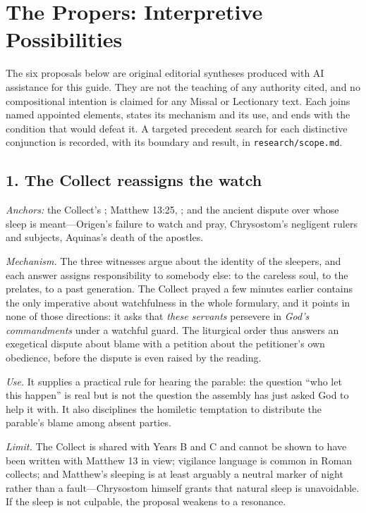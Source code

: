 \section*{The Propers: Interpretive Possibilities}

The six proposals below are original editorial syntheses produced with AI
assistance for this guide. They are not the teaching of any authority cited,
and no compositional intention is claimed for any Missal or Lectionary text.
Each joins named appointed elements, states its mechanism and its use, and ends
with the condition that would defeat it. A targeted precedent search for each
distinctive conjunction is recorded, with its boundary and result, in
\texttt{research/scope.md}.

\subsection*{1. The Collect reassigns the watch}

\emph{Anchors:} the Collect's ; Matthew
13:25, ; and the ancient dispute over whose
sleep is meant---Origen's failure to watch and pray, Chrysostom's negligent
rulers and subjects, Aquinas's death of the apostles.

\emph{Mechanism.} The three witnesses argue about the identity of the sleepers,
and each answer assigns responsibility to somebody else: to the careless soul,
to the prelates, to a past generation. The Collect prayed a few minutes earlier
contains the only imperative about watchfulness in the whole formulary, and it
points in none of those directions: it asks that \emph{these servants} persevere
in \emph{God's commandments} under a watchful guard. The liturgical order thus
answers an exegetical dispute about blame with a petition about the
petitioner's own obedience, before the dispute is even raised by the reading.

\emph{Use.} It supplies a practical rule for hearing the parable: the question
``who let this happen'' is real but is not the question the assembly has just
asked God to help it with. It also disciplines the homiletic temptation to
distribute the parable's blame among absent parties.

\emph{Limit.} The Collect is shared with Years B and C and cannot be shown to
have been written with Matthew 13 in view; vigilance language is common in
Roman collects; and Matthew's sleeping is at least arguably a neutral marker of
night rather than a fault---Chrysostom himself grants that natural sleep is
unavoidable. If the sleep is not culpable, the proposal weakens to a
resonance.

